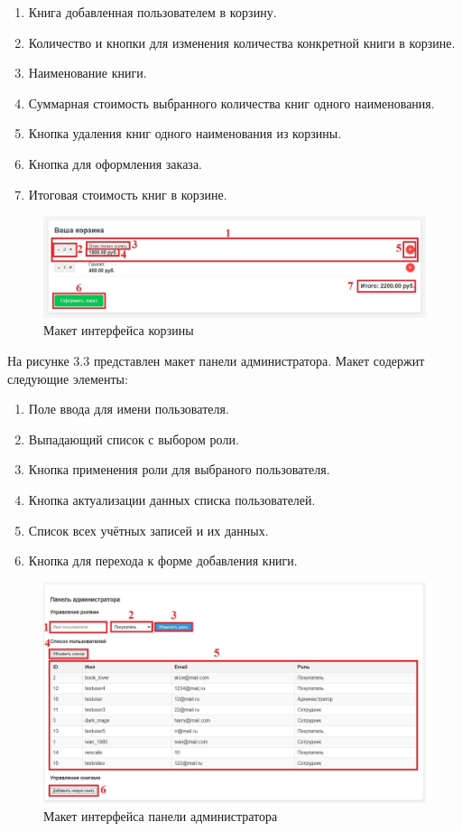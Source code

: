 \begin{enumerate}
	\item Книга добавленная пользователем в корзину.
	\item Количество и кнопки для изменения количества конкретной книги в корзине.
	\item Наименование книги.
	\item Суммарная стоимость выбранного количества книг одного наименования.
	\item Кнопка удаления книг одного наименования из корзины.
	\item Кнопка для оформления заказа.
	\item Итоговая стоимость книг в корзине.
\end{enumerate}

\begin{figure}[H]
	\centering
	\includegraphics[width=0.7\linewidth]{images/Корзина}
	\caption{Макет интерфейса корзины}
	\label{fig:}
\end{figure}

На рисунке 3.3 представлен макет панели администратора. Макет содержит следующие элементы:

\begin{enumerate}
	\item Поле ввода для имени пользователя.
	\item Выпадающий список с выбором роли.
	\item Кнопка применения роли для выбраного пользователя.
	\item Кнопка актуализации данных списка пользователей.
	\item Список всех учётных записей и их данных.
	\item Кнопка для перехода к форме добавления книги.
\end{enumerate}

\begin{figure}[H]
	\centering
	\includegraphics[width=0.7\linewidth]{images/Панель_администратора}
	\caption{Макет интерфейса панели администратора}
	\label{fig:}
\end{figure}


